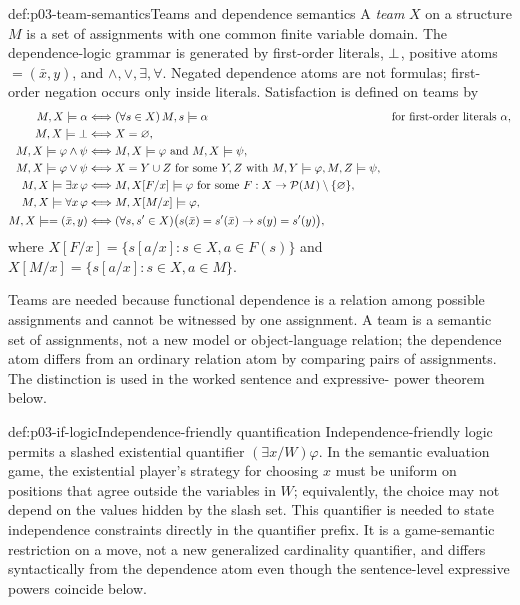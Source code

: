 \begin{hbdefinition}{def:p03-team-semantics}{Teams and dependence semantics}
A \emph{team} \(X\) on a structure \(M\) is a set of assignments with one
common finite variable domain.  The dependence-logic grammar is generated by
first-order literals, \(\bot\), positive atoms \(=(\bar x,y)\), and
\(\land,\lor,\exists,\forall\).  Negated dependence atoms are not formulas;
first-order negation occurs only inside literals.  Satisfaction is defined on
teams by
\[
\begin{aligned}
 M,X\models\alpha
   &\Longleftrightarrow (\forall s\in X)\,M,s\models\alpha
        &&\text{for first-order literals }\alpha,\\
 M,X\models\bot
   &\Longleftrightarrow X=\varnothing,\\
 M,X\models\varphi\land\psi
   &\Longleftrightarrow M,X\models\varphi\text{ and }M,X\models\psi,\\
 M,X\models\varphi\lor\psi
   &\Longleftrightarrow X=Y\cup Z\text{ for some }Y,Z
       \text{ with }M,Y\models\varphi, M,Z\models\psi,\\
 M,X\models\exists x\,\varphi
   &\Longleftrightarrow M,X[F/x]\models\varphi
       \text{ for some }F:X\to\mathcal P(M)\setminus\{\varnothing\},\\
 M,X\models\forall x\,\varphi
   &\Longleftrightarrow M,X[M/x]\models\varphi,\\
 M,X\models=(\bar x,y)
   &\Longleftrightarrow
     (\forall s,s'\in X)\bigl(s(\bar x)=s'(\bar x)\to s(y)=s'(y)\bigr),
\end{aligned}
\]
where
\(X[F/x]=\{s[a/x]:s\in X, a\in F(s)\}\) and
\(X[M/x]=\{s[a/x]:s\in X, a\in M\}\).

Teams are needed because functional dependence is a relation among possible
assignments and cannot be witnessed by one assignment.  A team is a semantic
set of assignments, not a new model or object-language relation; the
dependence atom differs from an ordinary relation atom by comparing pairs of
assignments.  The distinction is used in the worked sentence and expressive-
power theorem below.
\end{hbdefinition}

\begin{hbdefinition}{def:p03-if-logic}{Independence-friendly quantification}
Independence-friendly logic permits a slashed existential quantifier
\((\exists x/W)\varphi\).  In the semantic evaluation game, the existential
player's strategy for choosing \(x\) must be uniform on positions that agree
outside the variables in \(W\); equivalently, the choice may not depend on the
values hidden by the slash set.  This quantifier is needed to state
independence constraints directly in the quantifier prefix.  It is a
game-semantic restriction on a move, not a new generalized cardinality
quantifier, and differs syntactically from the dependence atom even though the
sentence-level expressive powers coincide below.
\end{hbdefinition}

